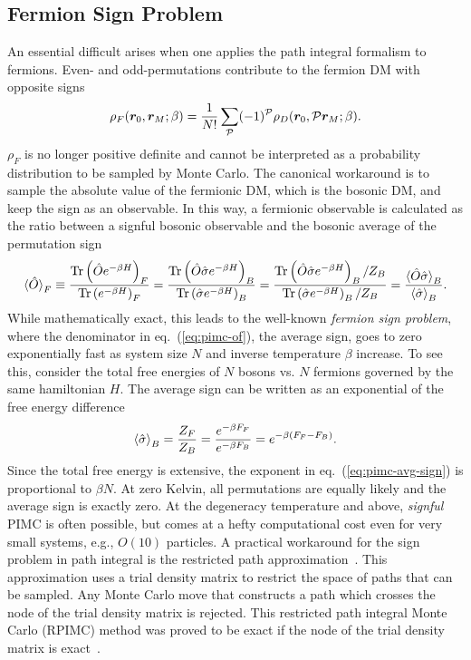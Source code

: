 \subsection{Fermion Sign Problem} \label{sec:fermion-sign-problem}
An essential difficult arises when one applies the path integral formalism to fermions. Even- and odd-permutations contribute to the fermion DM with opposite signs
\begin{align}
\rho_F(\boldsymbol{r}_0,\boldsymbol{r}_M;\beta) = \frac{1}{N!}\sum\limits_{\mathcal{P}} (-1)^{\mathcal{P}} \rho_D(\boldsymbol{r}_0, \mathcal{P}\boldsymbol{r}_M;\beta).
\end{align}
$\rho_F$ is no longer positive definite and cannot be interpreted as a probability distribution to be sampled by Monte Carlo. The canonical workaround is to sample the absolute value of the fermionic DM, which is the bosonic DM, and keep the sign as an observable. In this way, a fermionic observable is calculated as the ratio between a signful bosonic observable and the bosonic average of the permutation sign
\begin{align} \label{eq:pimc-of}
\braket{\hat{O}}_F \equiv \dfrac{\text{Tr}\left(\hat{O}e^{-\beta H}\right)_F}{\text{Tr}\left(e^{-\beta H}\right)_F}=
\dfrac{\text{Tr}\left(\hat{O}\hat{\sigma}e^{-\beta H}\right)_B}{\text{Tr}\left(\hat{\sigma} e^{-\beta H}\right)_B}=
\dfrac{\text{Tr}\left(\hat{O}\hat{\sigma}e^{-\beta H}\right)_B/Z_B}{\text{Tr}\left(\hat{\sigma} e^{-\beta H}\right)_B/Z_B}=\dfrac{\braket{\hat{O}\hat{\sigma}}_B}{ \braket{\hat{\sigma}}_B }.
\end{align}
While mathematically exact, this leads to the well-known \emph{fermion sign problem}, where the denominator in eq.~(\ref{eq:pimc-of}), the average sign, goes to zero exponentially fast as system size $N$ and inverse temperature $\beta$ increase.
To see this, consider the total free energies of $N$ bosons vs. $N$ fermions governed by the same hamiltonian $H$. The average sign can be written as an exponential of the free energy difference
\begin{align} \label{eq:pimc-avg-sign}
\braket{\hat{\sigma}}_B = \dfrac{Z_F}{Z_B} = \dfrac{e^{-\beta F_F}}{e^{-\beta F_B}} = e^{-\beta (F_F-F_B)}.
\end{align}
Since the total free energy is extensive, the exponent in eq.~(\ref{eq:pimc-avg-sign}) is proportional to $\beta N$.
At zero Kelvin, all permutations are equally likely and the average sign is exactly zero.
At the degeneracy temperature and above, \textit{signful} PIMC is often possible, but comes at a hefty computational cost even for very small systems, e.g., $O(10)$ particles.
A practical workaround for the sign problem in path integral is the restricted path approximation~\cite{Ceperley1991,Ceperley1992,Ceperley1996}.
This approximation uses a trial density matrix to restrict the space of paths that can be sampled.
Any Monte Carlo move that constructs a path which crosses the node of the trial density matrix is rejected.
This restricted path integral Monte Carlo (RPIMC) method was proved to be exact if the node of the trial density matrix is exact~\cite{Ceperley1992}.

